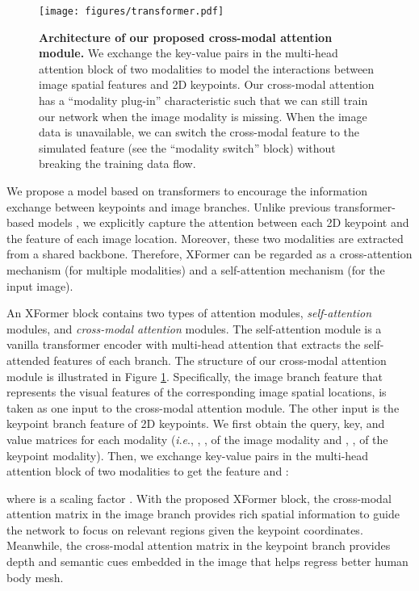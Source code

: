 \documentclass{article}
\newcommand{\ie}{\textit{i}.\textit{e}.}
\begin{document}
\begin{figure}[t]
\centering
  \texttt{[image: figures/transformer.pdf]}
  \caption{\textbf{Architecture of our proposed cross-modal attention module.} 
  We exchange the key-value pairs in the multi-head attention block of two modalities to model the interactions between image spatial features and 2D keypoints. Our cross-modal attention has a ``modality plug-in'' characteristic such that we can still train our network when the image modality is missing. When the image data is unavailable, we can switch the cross-modal feature  to the simulated feature  (see the ``modality switch'' block) without breaking the training data flow. 
  }
   \vspace{-10pt}
  \label{fig:transformer}
\end{figure}

We propose a model based on transformers \cite{vaswani2017attention} to encourage the information exchange between keypoints and image branches. Unlike previous transformer-based models \cite{lin2021-mesh-graphormer,lin2020end,li2021lifting,li2022mhformer}, we explicitly capture the attention between each 2D keypoint and the feature of each image location. Moreover, these two modalities are extracted from a shared backbone. Therefore, XFormer can be regarded as a cross-attention mechanism (for multiple modalities) and a self-attention mechanism (for the input image).

An XFormer block contains two types of attention modules, \textit{self-attention} modules, and \textit{cross-modal attention} modules. The self-attention module is a vanilla transformer encoder with multi-head attention that extracts the self-attended features of each branch. 
The structure of our cross-modal attention module is illustrated in Figure \ref{fig:transformer}. 
Specifically, the image branch feature  that represents the visual features of the corresponding image spatial locations, is taken as one input to the cross-modal attention module. The other input is the keypoint branch feature  of 2D keypoints. 
We first obtain the query, key, and value matrices for each modality (\ie, , ,  of the image modality and , ,  of the keypoint modality). Then, we exchange key-value pairs in the multi-head attention block of two modalities to get the feature  and :


where  is a scaling factor \cite{vaswani2017attention}. 
With the proposed XFormer block, the cross-modal attention matrix in the image branch provides rich spatial information to guide the network to focus on relevant regions given the keypoint coordinates. Meanwhile, the cross-modal attention matrix in the keypoint branch provides depth and semantic cues embedded in the image that helps regress better human body mesh. 
\end{document}
